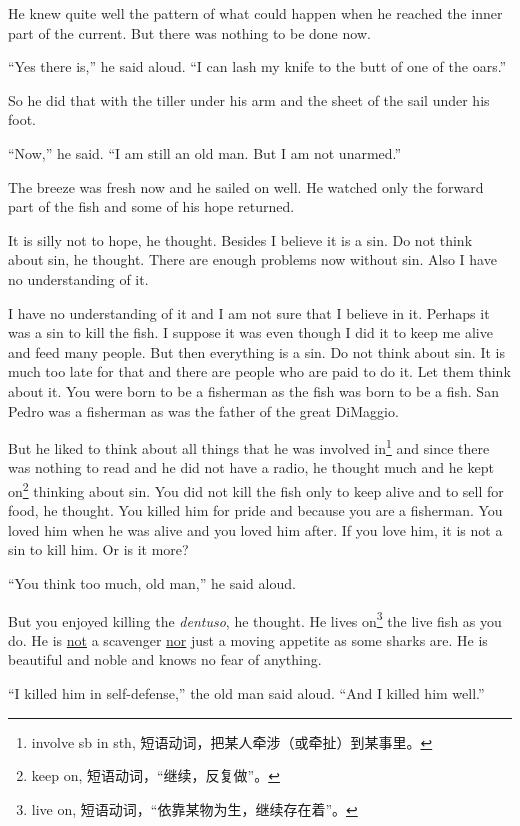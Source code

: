 \documentclass[fontset=ubuntu,zihao=-4]{ctexrep}
\begin{document}
He knew quite well the \gls{pattern} of what could happen when he reached
the inner part of the current. But there was nothing to be done now.

``Yes there is,'' he said aloud. ``I can lash my knife to the \gls{butt} of one of
the oars.''

So he did that with the tiller under his arm and the \gls{sheet} of the sail
under his foot.

``Now,'' he said. ``I am still an old man. But I am not unarmed.''

The breeze was fresh now and he sailed on well. He watched only the forward
part of the fish and some of his hope returned.

It is \gls{silly} not to hope, he thought. Besides I believe it is a
\gls{sin}. Do not think about sin, he thought. There are enough problems now
without sin. Also I have no \gls{understanding} of it.

I have no understanding of it and I am not sure that I believe in it.
Perhaps it was a sin to kill the fish. I suppose it was even though I did it
to keep me alive and feed many people. But then everything is a sin. Do not
think about sin. It is much too late for that and there are people who are
paid to do it. Let them think about it. You were born to be a fisherman as
the fish was born to be a fish. San Pedro was a fisherman as was the father
of the great DiMaggio.

But he liked to think about all things that he was \gls{involved}
in\footnote{involve sb in sth, 短语动词，把某人牵涉（或牵扯）到某事里。} and
since there was nothing to read and he did not have a radio, he thought much
and he kept on\footnote{keep on, 短语动词，“继续，反复做”。} thinking
about sin. You did not kill the fish only to keep alive and to sell for
food, he thought. You killed him for pride and because you are a fisherman.
You loved him when he was alive and you loved him after. If you love him, it
is not a sin to kill him. Or is it more?

``You think too much, old man,'' he said aloud.

But you enjoyed killing the \emph{dentuso}, he thought. He lives on\footnote{live
  on, 短语动词，“依靠某物为生，继续存在着”。} the live fish as you do. He
is \uline{not} a \gls{scavenger} \uline{nor} just a moving \gls{appetite} as some
sharks are. He is beautiful and noble and knows no fear of anything.

``I killed him in self-defense,'' the old man said aloud. ``And I killed him
well.''
\end{document}

